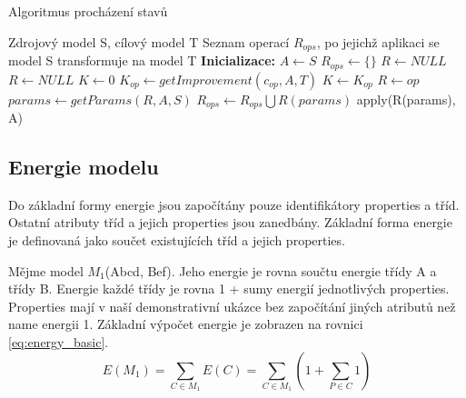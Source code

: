 \documentclass[11pt,twoside,a4paper]{book}
\begin{document}
\begin{algorithm}
\caption{Algoritmus procházení stavů}\label{algo:state}

\begin{algorithmic}[1]
\Require Zdrojový model S, cílový model T
\Ensure Seznam operací $R_{ops}$, po jejichž aplikaci se model S transformuje na
     model T
\Statex
\State \textbf{Inicializace:}
\State $A \gets S$ 
\State $R_{ops} \gets \{\}$
\State $R\gets NULL$ 
\Statex
  \Repeat \label{algo:state:repeat}
   \State $R\gets NULL$
   \State $K\gets 0$ \label{algo:state:improvement}
   	   
   	  \label{algo:state:forOps}
   	  \State $K_{op} \gets getImprovement(c_{op}, A, T)$ 
      	\Comment
      	  \State $K\gets K_{op}$
      	  \State $R \gets op$
      	\EndIf
      \EndFor \label{algo:state:forOpsEnd} 
       \label{algo:state:addOp}
         \State $params \gets getParams(R, A, S)$ \label{algo:state:getParams}
         \State $R_{ops}\gets R_{ops} \bigcup R(params)$
         \State apply(R(params), A)      
      \EndIf
   \label{algo:state:terminal_condition}
\end{algorithmic}

\end{algorithm}

\subsection{Energie modelu}
Do základní formy energie jsou započítány pouze identifikátory properties a
tříd. Ostatní atributy tříd a jejich properties jsou zanedbány. Základní forma
energie je definovaná jako součet existujících tříd a jejich properties.

Mějme model $M_1$(Abcd, Bef). Jeho energie je rovna součtu energie třídy A a
třídy B. Energie každé třídy je rovna 1 + sumy energií jednotlivých properties.
Properties mají v naší demonstrativní ukázce bez započítání jiných atributů než
name energii 1. Základní výpočet energie je zobrazen na
rovnici \eqref{eq:energy_basic}.
 \begin{equation}E(M_1) = \sum_{C \in
 M_1}E(C)= \sum_{C \in
 M_1}(1 + \sum_{P \in C} 1)\label{eq:energy_basic}\end{equation}
\end{document}

